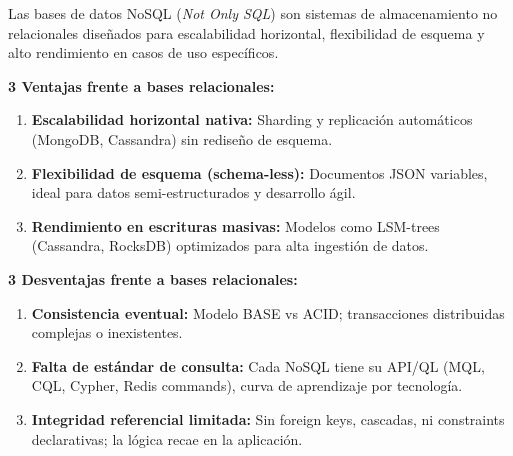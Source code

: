 Las bases de datos NoSQL (\textit{Not Only SQL}) son sistemas de almacenamiento no relacionales diseñados para escalabilidad horizontal, flexibilidad de esquema y alto rendimiento en casos de uso específicos.

\textbf{3 Ventajas frente a bases relacionales:}
\begin{enumerate}
    \item \textbf{Escalabilidad horizontal nativa:} Sharding y replicación automáticos (MongoDB, Cassandra) sin rediseño de esquema.
    \item \textbf{Flexibilidad de esquema (schema-less):} Documentos JSON variables, ideal para datos semi-estructurados y desarrollo ágil.
    \item \textbf{Rendimiento en escrituras masivas:} Modelos como LSM-trees (Cassandra, RocksDB) optimizados para alta ingestión de datos.
\end{enumerate}

\textbf{3 Desventajas frente a bases relacionales:}
\begin{enumerate}
    \item \textbf{Consistencia eventual:} Modelo BASE vs ACID; transacciones distribuidas complejas o inexistentes.
    \item \textbf{Falta de estándar de consulta:} Cada NoSQL tiene su API/QL (MQL, CQL, Cypher, Redis commands), curva de aprendizaje por tecnología.
    \item \textbf{Integridad referencial limitada:} Sin foreign keys, cascadas, ni constraints declarativas; la lógica recae en la aplicación.
\end{enumerate}